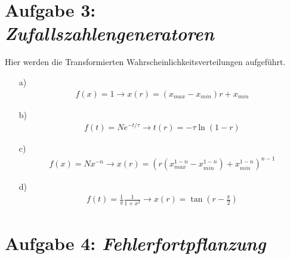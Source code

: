 \begin{itemize}
\begin{itemize}
\end{itemize}

\section*{Aufgabe 3: \emph{Zufallszahlengeneratoren}}
Hier werden die Transformierten Wahrscheinlichkeitsverteilungen aufgeführt.
\begin{itemize}
\item[a)]
\begin{align*}
f(x) = 1
\rightarrow x(r) =  (x_{max} - x_{min}) r + x_{min}
\end{align*}
\item[b)] 
\begin{align*}
f(t) = N e^{-t/\tau}
\rightarrow t(r) = -\tau \ln(1-r)
\end{align*}
\item[c)] 
\begin{align*}
f(x) = N x^{-n}
\rightarrow x(r) = ( r  (x_{max}^{1-n} - x_{min}^{1-n}) +x_{min}^{1-n})^{n-1}
\end{align*}
\item[d)]
\begin{align*}
f(t) = \frac{1}{\pi} \frac{1}{1+x^2}
\rightarrow x(r) = \tan\left(r-\frac{\pi}{2}\right)
\end{align*}
\end{itemize}

\section*{Aufgabe 4: \emph{Fehlerfortpflanzung}}
\begin{itemize}


\end{itemize}
\end{itemize}
